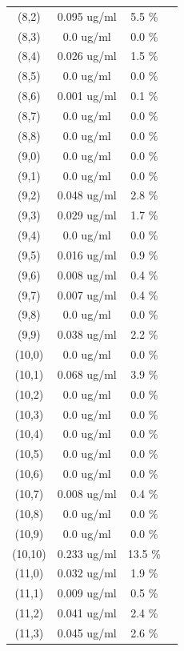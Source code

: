 \documentclass{article}
\begin{document}
\begin{tabular}{c c c c}
(8,2)&        0.095 ug/ml        &5.5 \%\\
(8,3)&        0.0 ug/ml        &0.0 \%\\
(8,4)&        0.026 ug/ml        &1.5 \%\\
(8,5)&        0.0 ug/ml        &0.0 \%\\
(8,6)&        0.001 ug/ml        &0.1 \%\\
(8,7)&        0.0 ug/ml        &0.0 \%\\
(8,8)&        0.0 ug/ml        &0.0 \%\\
(9,0)&        0.0 ug/ml        &0.0 \%\\
(9,1)&        0.0 ug/ml        &0.0 \%\\
(9,2)&        0.048 ug/ml        &2.8 \%\\
(9,3)&        0.029 ug/ml        &1.7 \%\\
(9,4)&        0.0 ug/ml        &0.0 \%\\
(9,5)&        0.016 ug/ml        &0.9 \%\\
(9,6)&        0.008 ug/ml        &0.4 \%\\
(9,7)&        0.007 ug/ml        &0.4 \%\\
(9,8)&        0.0 ug/ml        &0.0 \%\\
(9,9)&        0.038 ug/ml        &2.2 \%\\
(10,0)&        0.0 ug/ml        &0.0 \%\\
(10,1)&        0.068 ug/ml        &3.9 \%\\
(10,2)&        0.0 ug/ml        &0.0 \%\\
(10,3)&        0.0 ug/ml        &0.0 \%\\
(10,4)&        0.0 ug/ml        &0.0 \%\\
(10,5)&        0.0 ug/ml        &0.0 \%\\
(10,6)&        0.0 ug/ml        &0.0 \%\\
(10,7)&        0.008 ug/ml        &0.4 \%\\
(10,8)&        0.0 ug/ml        &0.0 \%\\
(10,9)&        0.0 ug/ml        &0.0 \%\\
(10,10)&        0.233 ug/ml        &13.5 \%\\
(11,0)&        0.032 ug/ml        &1.9 \%\\
(11,1)&        0.009 ug/ml        &0.5 \%\\
(11,2)&        0.041 ug/ml        &2.4 \%\\
(11,3)&        0.045 ug/ml        &2.6 \%\\

\end{tabular}
\end{document}

